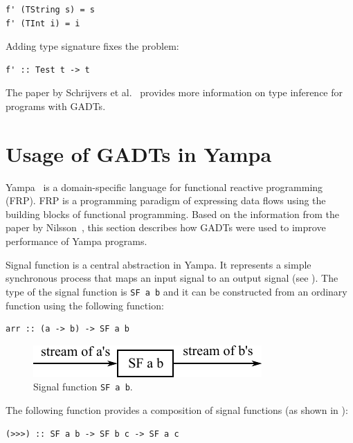 \documentclass{tmr}
\begin{document}
\begin{Verbatim}
f' (TString s) = s
f' (TInt i) = i
\end{Verbatim}

Adding type signature fixes the problem:

\begin{Verbatim}
f' :: Test t -> t
\end{Verbatim}

The paper by Schrijvers et al.~\cite{type_inference_gadts} provides more information on type inference for programs with GADTs.

\section{Usage of GADTs in Yampa}
\label{sec:yampa}

Yampa~\cite{yampa} is a domain-specific language for functional reactive programming (FRP). FRP is a programming paradigm of expressing data flows using the building blocks of functional programming. Based on the information from the paper by Nilsson~\cite{yampa_gadts}, this section describes how GADTs were used to improve performance of Yampa programs.

Signal function is a central abstraction in Yampa. It represents a simple synchronous process that maps an input signal to an output signal (see ). The type of the signal function is \verb|SF a b| and it can be constructed from an ordinary function using the following function:

\begin{Verbatim}
arr :: (a -> b) -> SF a b
\end{Verbatim}

\begin{figure}
\centering
\includegraphics{signal_function}
\vspace{5pt}
\caption{Signal function \texttt{SF a b}.}
\label{fig:signal_function}
\end{figure}

The following function provides a composition of signal functions (as shown in ):

\begin{Verbatim}
(>>>) :: SF a b -> SF b c -> SF a c
\end{Verbatim}
\end{document}
